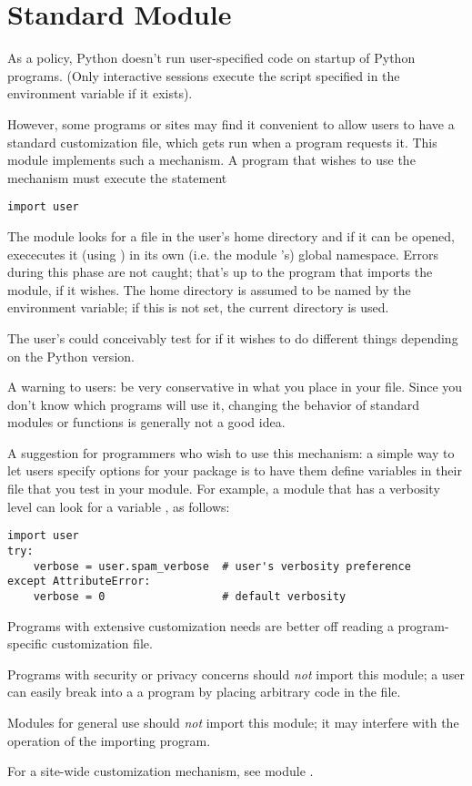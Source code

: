 \section{Standard Module }
\label{module-user}

As a policy, Python doesn't run user-specified code on startup of
Python programs.  (Only interactive sessions execute the script
specified in the  environment variable if it exists).

However, some programs or sites may find it convenient to allow users
to have a standard customization file, which gets run when a program
requests it.  This module implements such a mechanism.  A program
that wishes to use the mechanism must execute the statement

\bcode\begin{verbatim}
import user
\end{verbatim}\ecode

The  module looks for a file  in the user's
home directory and if it can be opened, exececutes it (using
) in its own (i.e. the module 's) global
namespace.  Errors during this phase are not caught; that's up to the
program that imports the  module, if it wishes.  The home
directory is assumed to be named by the  environment
variable; if this is not set, the current directory is used.

The user's  could conceivably test for
 if it wishes to do different things depending on
the Python version.

A warning to users: be very conservative in what you place in your
 file.  Since you don't know which programs will
use it, changing the behavior of standard modules or functions is
generally not a good idea.

A suggestion for programmers who wish to use this mechanism: a simple
way to let users specify options for your package is to have them
define variables in their  file that you test in
your module.  For example, a module  that has a verbosity
level can look for a variable , as follows:

\bcode\begin{verbatim}
import user
try:
    verbose = user.spam_verbose  # user's verbosity preference
except AttributeError:
    verbose = 0                  # default verbosity
\end{verbatim}\ecode

Programs with extensive customization needs are better off reading a
program-specific customization file.

Programs with security or privacy concerns should \emph{not} import
this module; a user can easily break into a a program by placing
arbitrary code in the  file.

Modules for general use should \emph{not} import this module; it may
interfere with the operation of the importing program.

For a site-wide customization mechanism, see module .
